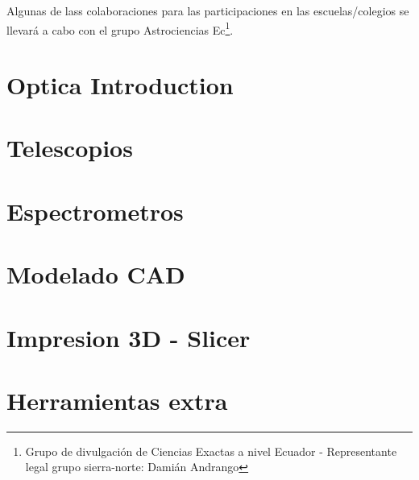 \documentclass[12pt, twoside]{book}
\begin{document}
	Algunas de lass colaboraciones para las participaciones en las escuelas/colegios se llevará a cabo con el grupo Astrociencias Ec\footnote{Grupo de divulgación de Ciencias Exactas a nivel Ecuador - Representante legal grupo sierra-norte: Damián Andrango}. 
	
	\chapter{Optica Introduction}
	\label{optica_fundamentals}
	
	
	\chapter{Telescopios}
	\label{chapter_telescopes}
	
	
	\chapter{Espectrometros}
	\label{chapter_spectrometers}
	
	
	\chapter{Modelado CAD}
	\label{solidworks_focused_telescopes}
	
	
	\chapter{Impresion 3D - Slicer}
	
	\chapter{Herramientas extra}
	\label{advanced_techniques}
	
	
	\backmatter
	\printbibliography[title={Referencias Bibliográficas}]
	
\end{document}
